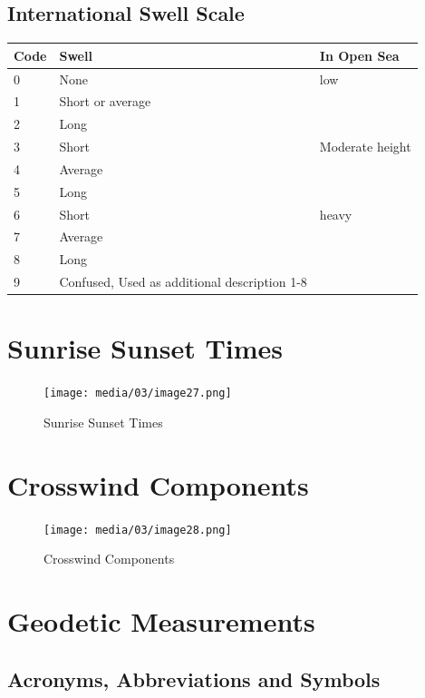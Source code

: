 \documentclass[
]{book}
\begin{document}
\hypertarget{international-swell-scale}{%
\subsection*{International Swell Scale}\label{international-swell-scale}}

\begin{longtable}[]{@{}lll@{}}
\toprule
Code & Swell & In Open Sea\tabularnewline
\midrule
\endhead
0 & None & low\tabularnewline
1 & Short or average &\tabularnewline
2 & Long &\tabularnewline
3 & Short & Moderate height\tabularnewline
4 & Average &\tabularnewline
5 & Long &\tabularnewline
6 & Short & heavy\tabularnewline
7 & Average &\tabularnewline
8 & Long &\tabularnewline
9 & Confused, Used as additional description 1-8 &\tabularnewline
\bottomrule
\end{longtable}

\hypertarget{sunrise-sunset-times}{%
\section{Sunrise Sunset Times}\label{sunrise-sunset-times}}

\begin{figure}
\centering
\texttt{[image: media/03/image27.png]}
\caption{Sunrise Sunset Times}
\end{figure}

\hypertarget{crosswind-components}{%
\section{Crosswind Components}\label{crosswind-components}}

\begin{figure}
\centering
\texttt{[image: media/03/image28.png]}
\caption{Crosswind Components}
\end{figure}

\hypertarget{geodetic-measurements}{%
\section{Geodetic Measurements}\label{geodetic-measurements}}

\hypertarget{acronyms-abbreviations-and-symbols}{%
\subsection*{Acronyms, Abbreviations and Symbols}\label{acronyms-abbreviations-and-symbols}}
\end{document}
